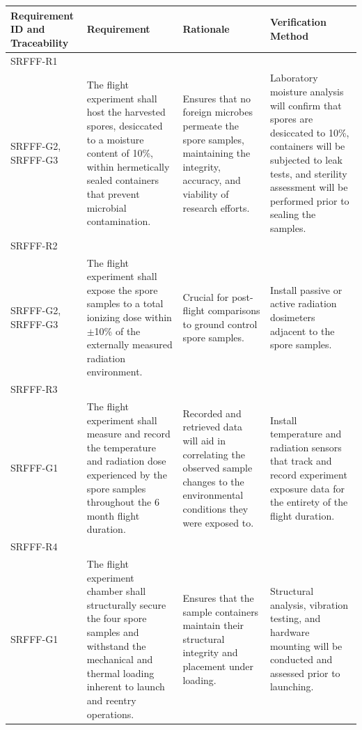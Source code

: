 \documentclass[conf]{new-aiaa}
\begin{document}
\begin{table}[H]
    \centering
    \footnotesize
    \setlength{\tabcolsep}{4pt}
    \renewcommand{\arraystretch}{1.15}
    \begin{tabularx}{\textwidth}{@{}>{\raggedright\arraybackslash}m{2.4cm}YYY@{}}
    \toprule
    \textbf{Requirement ID and Traceability} & \textbf{Requirement} & \textbf{Rationale} & \textbf{Verification Method} \\
    \midrule
    SRFFF-R1\\SRFFF-G2, SRFFF-G3 &
    The flight experiment shall host the harvested spores, desiccated to a moisture content of 10\%, within hermetically sealed containers that prevent microbial contamination. &
    Ensures that no foreign microbes permeate the spore samples, maintaining the integrity, accuracy, and viability of research efforts. &
    Laboratory moisture analysis will confirm that spores are desiccated to 10\%, containers will be subjected to leak tests, and sterility assessment will be performed prior to sealing the samples. \\ \hline

    SRFFF-R2\\SRFFF-G2, SRFFF-G3 &
    The flight experiment shall expose the spore samples to a total ionizing dose within $\pm$10\% of the externally measured radiation environment. &
    Crucial for post-flight comparisons to ground control spore samples. &
    Install passive or active radiation dosimeters adjacent to the spore samples. \\ \hline

    SRFFF-R3\\SRFFF-G1 &
    The flight experiment shall measure and record the temperature and radiation dose experienced by the spore samples throughout the 6 month flight duration. &
    Recorded and retrieved data will aid in correlating the observed sample changes to the environmental conditions they were exposed to. &
    Install temperature and radiation sensors that track and record experiment exposure data for the entirety of the flight duration. \\ \hline

    SRFFF-R4\\SRFFF-G1 &
    The flight experiment chamber shall structurally secure the four spore samples and withstand the mechanical and thermal loading inherent to launch and reentry operations. &
    Ensures that the sample containers maintain their structural integrity and placement under loading. &
    Structural analysis, vibration testing, and hardware mounting will be conducted and assessed prior to launching. \\ \hline


\end{tabularx}
\end{table}
\end{document}
